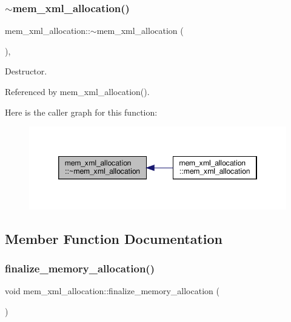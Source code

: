 \subsubsection{\texorpdfstring{$\sim$mem\+\_\+xml\+\_\+allocation()}{~mem\_xml\_allocation()}}
{\footnotesize\ttfamily mem\+\_\+xml\+\_\+allocation\+::$\sim$mem\+\_\+xml\+\_\+allocation (\begin{DoxyParamCaption}{ }\end{DoxyParamCaption})\hspace{0.3cm}{\ttfamily [override]}, {\ttfamily [default]}}



Destructor. 



Referenced by mem\+\_\+xml\+\_\+allocation().

Here is the caller graph for this function\+:
\nopagebreak
\begin{figure}[H]
\begin{center}
\leavevmode
\includegraphics[width=346pt]{d2/d51/classmem__xml__allocation_ae7fbf63ff2adab3c7cc127b095f1c225_icgraph}
\end{center}
\end{figure}


\subsection{Member Function Documentation}
\mbox{\label{classmem__xml__allocation_a138ace3d0d2e08742168d52adb53191f}} 
\subsubsection{\texorpdfstring{finalize\+\_\+memory\+\_\+allocation()}{finalize\_memory\_allocation()}}
{\footnotesize\ttfamily void mem\+\_\+xml\+\_\+allocation\+::finalize\+\_\+memory\+\_\+allocation (\begin{DoxyParamCaption}{ }\end{DoxyParamCaption})\hspace{0.3cm}{\ttfamily [private]}}



